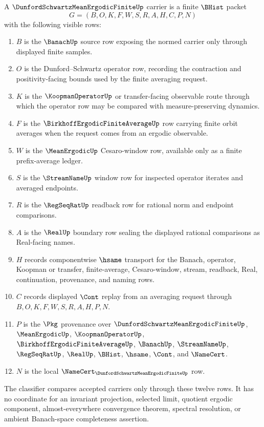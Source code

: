 \begin{definition}
\label{def:dunford-schwartz-mean-ergodic-finite-carrier}
A $\DunfordSchwartzMeanErgodicFiniteUp$ carrier is a finite $\BHist$ packet
$$
G=(B,O,K,F,W,S,R,A,H,C,P,N)
$$
with the following visible rows:
\begin{enumerate}
\item $B$ is the $\BanachUp$ source row exposing the normed carrier only through displayed finite samples.
\item $O$ is the Dunford--Schwartz operator row, recording the contraction and positivity-facing bounds used by the finite averaging request.
\item $K$ is the $\KoopmanOperatorUp$ or transfer-facing observable route through which the operator row may be compared with measure-preserving dynamics.
\item $F$ is the $\BirkhoffErgodicFiniteAverageUp$ row carrying finite orbit averages when the request comes from an ergodic observable.
\item $W$ is the $\MeanErgodicUp$ Cesaro-window row, available only as a finite prefix-average ledger.
\item $S$ is the $\StreamNameUp$ window row for inspected operator iterates and averaged endpoints.
\item $R$ is the $\RegSeqRatUp$ readback row for rational norm and endpoint comparisons.
\item $A$ is the $\RealUp$ boundary row sealing the displayed rational comparisons as Real-facing names.
\item $H$ records componentwise $\hsame$ transport for the Banach, operator, Koopman or transfer, finite-average, Cesaro-window, stream, readback, Real, continuation, provenance, and naming rows.
\item $C$ records displayed $\Cont$ replay from an averaging request through $B,O,K,F,W,S,R,A,H,P,N$.
\item $P$ is the $\Pkg$ provenance over $\DunfordSchwartzMeanErgodicFiniteUp$, $\MeanErgodicUp$, $\KoopmanOperatorUp$, $\BirkhoffErgodicFiniteAverageUp$, $\BanachUp$, $\StreamNameUp$, $\RegSeqRatUp$, $\RealUp$, $\BHist$, $\hsame$, $\Cont$, and $\NameCert$.
\item $N$ is the local $\NameCert_{\DunfordSchwartzMeanErgodicFiniteUp}$ row.
\end{enumerate}
The classifier compares accepted carriers only through these twelve rows. It has no coordinate for an invariant projection, selected limit, quotient ergodic component, almost-everywhere convergence theorem, spectral resolution, or ambient Banach-space completeness assertion.
\end{definition}

